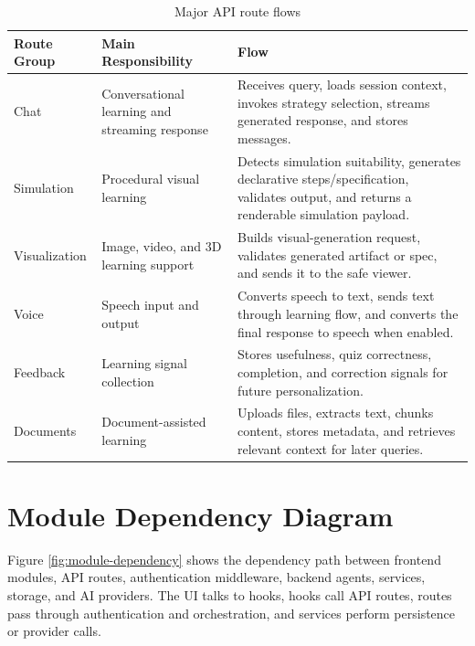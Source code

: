 \begin{table}[H]
\centering
\begin{tabular}{|p{3cm}|p{4.2cm}|p{6cm}|}
\hline
\textbf{Route Group} & \textbf{Main Responsibility} & \textbf{Flow} \\
\hline
Chat & Conversational learning and streaming response & Receives query, loads session context, invokes strategy selection, streams generated response, and stores messages. \\
\hline
Simulation & Procedural visual learning & Detects simulation suitability, generates declarative steps/specification, validates output, and returns a renderable simulation payload. \\
\hline
Visualization & Image, video, and 3D learning support & Builds visual-generation request, validates generated artifact or spec, and sends it to the safe viewer. \\
\hline
Voice & Speech input and output & Converts speech to text, sends text through learning flow, and converts the final response to speech when enabled. \\
\hline
Feedback & Learning signal collection & Stores usefulness, quiz correctness, completion, and correction signals for future personalization. \\
\hline
Documents & Document-assisted learning & Uploads files, extracts text, chunks content, stores metadata, and retrieves relevant context for later queries. \\
\hline
\end{tabular}
\caption{Major API route flows}
\label{tab:api-flow}
\end{table}

\section{Module Dependency Diagram}

Figure \ref{fig:module-dependency} shows the dependency path between frontend modules, API routes, authentication middleware, backend agents, services, storage, and AI providers. The UI talks to hooks, hooks call API routes, routes pass through authentication and orchestration, and services perform persistence or provider calls.

